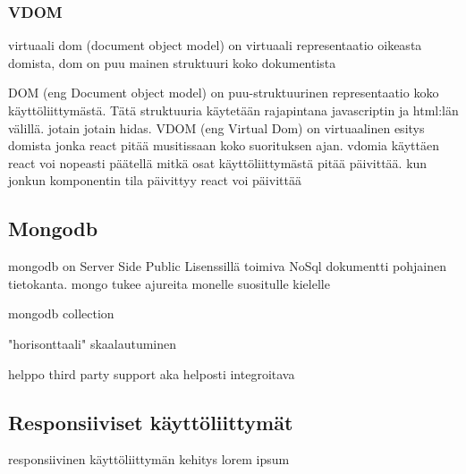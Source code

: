 \documentclass[11pt,a4paper,titlepage,oneside]{article}
\begin{document}
\subsubsection{VDOM}



virtuaali dom (document object model) on virtuaali representaatio oikeasta domista, 
dom on puu mainen struktuuri koko dokumentista



DOM (eng Document object model) on puu-struktuurinen representaatio koko käyttöliittymästä.
Tätä struktuuria käytetään rajapintana javascriptin ja html:län välillä. jotain jotain hidas.
%
VDOM (eng Virtual Dom) on virtuaalinen esitys domista jonka react pitää musitissaan koko suorituksen ajan.
vdomia käyttäen react voi nopeasti päätellä mitkä osat käyttöliittymästä pitää päivittää.
kun jonkun komponentin tila päivittyy react voi päivittää 






\newpage
\subsection{Mongodb}





mongodb on Server Side Public Lisenssillä toimiva NoSql dokumentti pohjainen tietokanta.%
mongo tukee ajureita monelle suositulle kielelle

mongodb collection

"horisonttaali" skaalautuminen

helppo third party support
aka helposti integroitava





\subsection{Responsiiviset käyttöliittymät}
responsiivinen käyttöliittymän kehitys lorem ipsum
\end{document}
